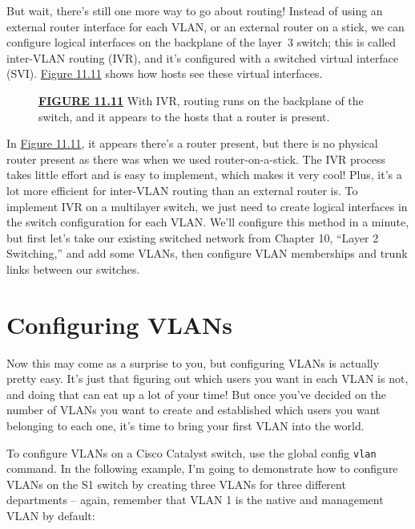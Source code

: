 \documentclass[b5paper,11pt]{memoir}
\begin{document}
But wait, there's still one more way to go about routing! Instead of
using an external router interface for each VLAN, or an external router
on a stick, we can configure logical interfaces on the backplane of the
layer~3 switch; this is called inter-VLAN routing (IVR), and it's
configured with a switched virtual interface (SVI).
\protect\hyperlink{c11.xhtmlux5cux23figure11-11}{Figure 11.11} shows how
hosts see these virtual interfaces.



\begin{figure}
\centering
\caption{{\protect\hyperlink{c11.xhtmlux5cux23figureanchor11-11}{\textbf{FIGURE
11.11}} With IVR, routing runs on the backplane of the switch, and it
appears to the hosts that a router is present.}}
\end{figure}

In \protect\hyperlink{c11.xhtmlux5cux23figure11-11}{Figure 11.11}, it
appears there's a router present, but there is no physical router
present as there was when we used router-on-a-stick. The IVR process
takes little effort and is easy to implement, which makes it very cool!
Plus, it's a lot more efficient for inter-VLAN routing than an external
router is. To implement IVR on a multilayer switch, we just need to
create logical interfaces in the switch configuration for each VLAN.
We'll configure this method in a minute, but first let's take our
existing switched network from Chapter 10, ``Layer 2 Switching,'' and
add some VLANs, then configure VLAN memberships and trunk links between
our switches.




\section{Configuring VLANs}

Now this may come as a surprise to you, but configuring VLANs is actually pretty easy.
It's just that figuring out which users you want
in each VLAN is not, and doing that can eat up a lot of your time! But
once you've decided on the number of VLANs you want to create and
established which users you want belonging to each one, it's time to
bring your first VLAN into the world.

To configure VLANs on a Cisco Catalyst switch, use the global config
\texttt{vlan} command. In the following example, I'm going to
demonstrate how to configure VLANs on the S1 switch by creating three
VLANs for three different departments -- again, remember that VLAN 1 is
the native and management VLAN by default:
\end{document}
